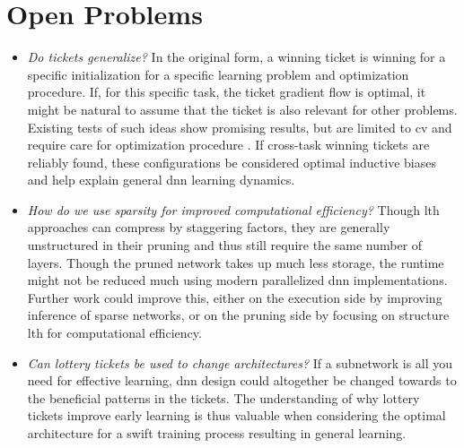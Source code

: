 \documentclass[12pt,fleqn,twocolumn]{article}
\begin{document}
\section*{Open Problems}%
\label{sec:Open Problems}
\begin{itemize}
    \item \emph{Do tickets generalize?}
        In the original form, a winning ticket is winning for a specific initialization for a specific learning problem and optimization procedure.
        If, for this specific task, the ticket gradient flow is optimal, it might be natural to assume that the ticket is also relevant for other problems.
        Existing tests of such ideas show promising results, but are limited to \acrshort{cv} and require care for optimization procedure \cite{Morcos2019OneTT}.
        If cross-task winning tickets are reliably found, these configurations be considered optimal inductive biases and help explain general \acrshort{dnn} learning dynamics.
    \item \emph{How do we use sparsity for improved computational efficiency?}
        Though \acrshort{lth} approaches can compress by staggering factors, they are generally unstructured in their pruning and thus still require the same number of layers.
        Though the pruned network takes up much less storage, the runtime might not be reduced much using modern parallelized \acrshort{dnn} implementations.
        Further work could improve this, either on the execution side by improving inference of sparse networks, or on the pruning side by focusing on structure \acrshort{lth} for computational efficiency.
    \item \emph{Can lottery tickets be used to change architectures?}
        If a subnetwork is all you need for effective learning, \acrshort{dnn} design could altogether be changed towards to the beneficial patterns in the tickets.
        The understanding of why lottery tickets improve early learning is thus valuable when considering the optimal architecture for a swift training process resulting in general learning.
\end{itemize}

\clearpage
\renewcommand*{\bibfont}{\normalfont\footnotesize}
\printbibliography[heading=bibintoc]

\printglossary[type=\acronymtype]
\end{document}

